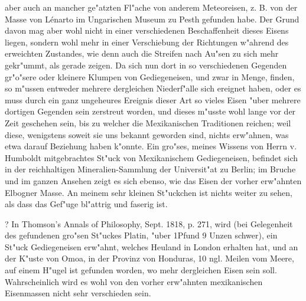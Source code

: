 \documentclass[a4paper, 11pt, oneside, polutonikogreek, german]{article}
\begin{document}
aber auch an mancher ge"atzten Fl"ache von anderem Meteoreisen, z. B. von der Masse von Lénarto im Ungarischen Museum zu Pesth gefunden habe. Der Grund davon mag aber wohl nicht in einer verschiedenen Beschaffenheit dieses Eisens liegen, sondern wohl mehr in einer Verschiebung der Richtungen w"ahrend des erweichten Zustandes, wie denn auch die Streifen nach Au"sen zu sich mehr gekr"ummt, als gerade zeigen. Da sich nun dort in so verschiedenen Gegenden gr"o"sere oder kleinere Klumpen von Gediegeneisen, und zwar in Menge, finden, so m"ussen entweder mehrere dergleichen Niederf"alle sich ereignet haben, oder es muss durch ein ganz ungeheures Ereignis dieser Art so vieles Eisen "uber mehrere dortigen Gegenden sein zerstreut worden, und dieses m"usste wohl lange vor der Zeit geschehen sein, bis zu welcher die Mexikanischen Traditionen reichen; weil diese, wenigstens soweit sie uns bekannt geworden sind, nichts erw"ahnen, was etwa darauf Beziehung haben k"onnte. Ein gro"ses, meines Wissens von Herrn v. Humboldt mitgebrachtes St"uck von Mexikanischem Gediegeneisen, befindet sich in der reichhaltigen Mineralien-Sammlung der Universit"at zu Berlin; im Bruche und im ganzen Ansehen zeigt es sich ebenso, wie das Eisen der vorher erw"ahnten Elbogner Masse. An meinem sehr kleinen St"uckchen ist nichts weiter zu sehen, als dass das Gef"uge bl"attrig und faserig ist.

? In Thomson's Annals of Philosophy, Sept. 1818, p. 271, wird (bei Gelegenheit des gefundenen gro"sen St"uckes Platin, "uber 1Pfund 9 Unzen schwer), ein St"uck Gediegeneisen erw"ahnt, welches Heuland in London erhalten hat, und an der K"uste von Omoa, in der Provinz von Honduras, 10 ngl. Meilen vom Meere, auf einem H"ugel ist gefunden worden, wo mehr dergleichen Eisen sein soll. Wahrscheinlich wird es wohl von den vorher erw"ahnten mexikanischen Eisenmassen nicht sehr verschieden sein.
\end{document}
